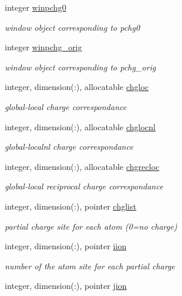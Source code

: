 \begin{DoxyCompactItemize}
integer \hyperlink{classcharge_aeef19bc488f8f88f255511cc1699a3bc}{winpchg0}
\begin{DoxyCompactList}\small\item\em window object corresponding to pchg0 \end{DoxyCompactList}\item 
integer \hyperlink{classcharge_af6924f1402ad3a9218fc27ba425ef6e0}{winpchg\-\_\-orig}
\begin{DoxyCompactList}\small\item\em window object corresponding to pchg\-\_\-orig \end{DoxyCompactList}\item 
integer, dimension(\-:), allocatable \hyperlink{classcharge_a45283ea4c54a0b8599a90c578a64c52d}{chgloc}
\begin{DoxyCompactList}\small\item\em global-\/local charge correspondance \end{DoxyCompactList}\item 
integer, dimension(\-:), allocatable \hyperlink{classcharge_a169a510a227dd75073a027063bb6557f}{chglocnl}
\begin{DoxyCompactList}\small\item\em global-\/localnl charge correspondance \end{DoxyCompactList}\item 
integer, dimension(\-:), allocatable \hyperlink{classcharge_a8a9599984bf2ac50e7cdd59700c7524e}{chgrecloc}
\begin{DoxyCompactList}\small\item\em global-\/local reciprocal charge correspondance \end{DoxyCompactList}\item 
integer, dimension(\-:), pointer \hyperlink{classcharge_aa135b867d77f87fcb396cb435a6bb71d}{chglist}
\begin{DoxyCompactList}\small\item\em partial charge site for each atom (0=no charge) \end{DoxyCompactList}\item 
integer, dimension(\-:), pointer \hyperlink{classcharge_ab3b8a9ef8a12e1eaff80d57d1d026aa4}{iion}
\begin{DoxyCompactList}\small\item\em number of the atom site for each partial charge \end{DoxyCompactList}\item 
integer, dimension(\-:), pointer \hyperlink{classcharge_a9b1fceb97f6b88a76a894859d0f50b96}{jion}

\end{DoxyCompactItemize}
